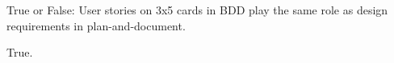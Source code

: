 \begin{checkyourself}
True or False: User stories on 3x5 cards in BDD play the same role as design requirements in plan-and-document.
\begin{answer}
True.
\end{answer}
\end{checkyourself}
